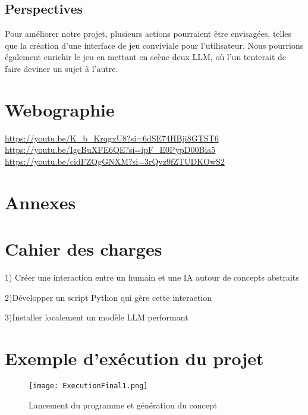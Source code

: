 \documentclass[a4paper, 12pt, twoside]{article}
\begin{document}
	\subsection{Perspectives}
    Pour améliorer notre projet, plusieurs actions pourraient être envisagées, telles que la création d’une interface de jeu conviviale pour l’utilisateur.
Nous pourrions également enrichir le jeu en mettant en scène deux LLM, où l’un tenterait de faire deviner un sujet à l’autre.

	


\newpage
\section{Webographie}
\begin{thebibliography}{2}
    \url{https://youtu.be/K_b_KrqgxU8?si=6dSE74HBji8GTST6 }
   \url{https://youtu.be/IgcBuXFE6QE?si=ipF_E0PypD00Bia5}
   \url {https://youtu.be/cidFZQgGNXM?si=3rQvz9fZTUDKOwS2
}
   
\end{thebibliography}


\newpage
\section{Annexes}
\appendix
\makeatletter
\def\@seccntformat#1{Annexe~\csname the#1\endcsname:\quad}
\makeatother
	\section{Cahier des charges}
1) Créer une interaction entre un humain et une IA autour de concepts abstraits

2)Développer un script Python qui gère cette interaction

3)Installer localement un modèle LLM performant

	\section{Exemple d'exécution du projet}


\begin{figure}[H]
  \centering
  \texttt{[image: ExecutionFinal1.png]}
  \caption{Lancement du programme et génération du concept}
\end{figure}
\end{document}
